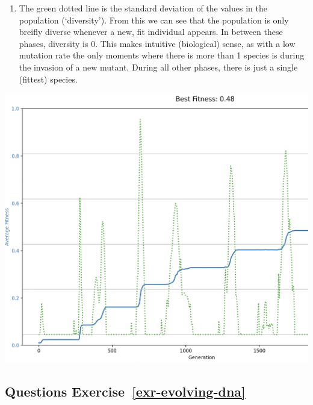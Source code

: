 \documentclass[
  letterpaper,
  DIV=11,
  numbers=noendperiod]{scrreprt}
\providecommand{\tightlist}{%
  \setlength{\itemsep}{0pt}\setlength{\parskip}{0pt}}\usepackage{longtable,booktabs,array}
\theoremstyle{definition}
\theoremstyle{remark}
\begin{document}
\begin{enumerate}
\def\labelenumi{\alph{enumi}.}
\tightlist
\item
  The green dotted line is the standard deviation of the values in the
  population (`diversity'). From this we can see that the population is
  only breifly diverse whenever a new, fit individual appears. In
  between these phases, diversity is 0. This makes intuitive
  (biological) sense, as with a low mutation rate the only moments where
  there is more than 1 species is during the invasion of a new mutant.
  During all other phases, there is just a single (fittest) species.
\end{enumerate}

\includegraphics{images/evo_pract2_div.png}

\subsection{\texorpdfstring{Questions
Exercise~\ref{exr-evolving-dna}}{Questions Exercise~}}\label{questions-exr-evolving-dna}
\end{document}
